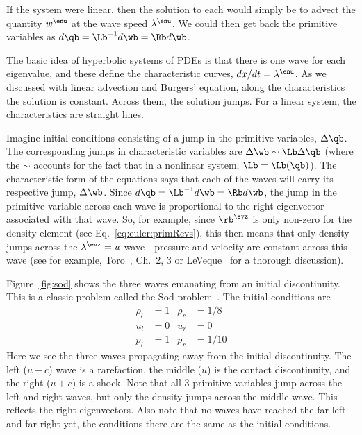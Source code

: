 If the system were linear, then the solution to each would simply be
to advect the quantity $w^\enu$ at the wave speed $\lambda^\enu$.  We
could then get back the primitive variables as $d\qb = \Lb^{-1} d\wb = \Rb d\wb$.

The basic idea of hyperbolic systems of PDEs is that there is one wave
for each eigenvalue, and these define the characteristic curves,
$dx/dt = \lambda^\enu$.  As we discussed with linear advection
and Burgers' equation, along the characteristics the solution is
constant.  Across them, the solution jumps.  For a linear system, the
characteristics are straight lines.

Imagine initial conditions consisting of a jump in the primitive
variables, $\Delta \qb$.  The corresponding jumps in characteristic
variables are $\Delta \wb \sim \Lb \Delta \qb$ (where the $\sim$ accounts
for the fact that in a nonlinear system, $\Lb = \Lb(\qb)$).  The
characteristic form of the equations says that each of the waves will
carry its respective jump, $\Delta \wb$.  Since $d\qb = \Lb^{-1}d\wb = \Rb d\wb$,
the jump in the primitive variable across each wave is proportional to
the right-eigenvector associated with that wave.  So, for example,
since $\rb^\evz$ is only non-zero for the density element (see
Eq.~\ref{eq:euler:primRevs}), this then means that only density jumps
across the $\lambda^\evz = u$ wave---pressure and velocity are
constant across this wave (see for example, Toro~\cite{toro:1997},
Ch.\ 2, 3 or LeVeque~\cite{leveque:2002} for a thorough discussion).

Figure~\ref{fig:sod} shows the three waves emanating from an initial
discontinuity.  This is a classic problem called the Sod
problem~\cite{sod:1978}.  The initial conditions are
\begin{align}
\rho_l &= 1      &  \rho_r &= 1/8 \nonumber \\
u_l   &= 0       &  u_r    &= 0   \\
p_l    &= 1      &  p_r    &= 1/10 \nonumber
\end{align}
Here we see the three waves propagating away from the initial
discontinuity.  The left ($u-c$) wave is a rarefaction, the middle
($u$) is the contact discontinuity, and the right ($u+c$) is a
shock. Note that all 3 primitive variables jump across the left and
right waves, but only the density jumps across the middle wave.  This
reflects the right eigenvectors.  Also note that no waves have reached
the far left and far right yet, the conditions there are the same as
the initial conditions.  


